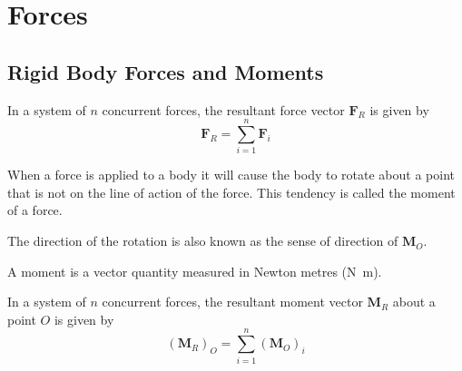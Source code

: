 \documentclass{article}
\begin{document}
\section{Forces}
\subsection{Rigid Body Forces and Moments}
\begin{definition}
    In a system of \(n\) concurrent forces, the resultant force vector \(\symbf{F}_R\) is given by
    \begin{equation*}
        \symbf{F}_R = \sum_{i = 1}^n \symbf{F}_i
    \end{equation*}
\end{definition}
\begin{definition}[Moment]
    When a force is applied to a body it will cause the body
    to rotate about a point that is not on the line of action of the force.
    This tendency is called the moment of a force.

    The direction of the rotation is also known as the sense of direction of \(\symbf{M}_O\).

    A moment is a vector quantity measured in Newton metres (\unit{N.m}).
\end{definition}
\begin{definition}
    In a system of \(n\) concurrent forces, the resultant moment vector \(\symbf{M}_R\) about a point \(O\) is given by
    \begin{equation*}
        \left( \symbf{M}_R \right)_{O} = \sum_{i = 1}^n \left( \symbf{M}_O \right)_i
    \end{equation*}
\end{definition}
\end{document}
